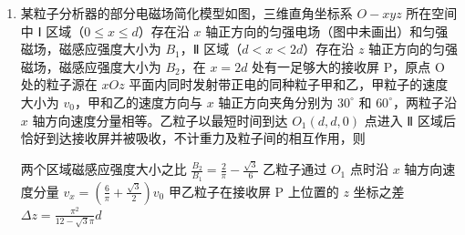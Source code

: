 \documentclass[\gkver]{gaokaozhenti}
\begin{document}
\begin{enumerate}
{	故选 BD。
}

\item
某粒子分析器的部分电磁场简化模型如图，三维直角坐标系 $O-xyz$ 所在空间中 Ⅰ 区域（$0 \leq x \leq d$）存在沿 $x$ 轴正方向的匀强电场（图中未画出）和匀强磁场，磁感应强度大小为 $B_{1}$，Ⅱ 区域（$d < x < 2d$）存在沿 $z$ 轴正方向的匀强磁场，磁感应强度大小为 $B_{2}$，在 $x = 2d$ 处有一足够大的接收屏 P，原点 O 处的粒子源在 $xOz$ 平面内同时发射带正电的同种粒子甲和乙，甲粒子的速度大小为 $v_{0}$，甲和乙的速度方向与 $x$ 轴正方向夹角分别为 $30^\circ$ 和 $60^\circ$，两粒子沿 $x$ 轴方向速度分量相等。乙粒子以最短时间到达 $O_{1}(d, d, 0)$ 点进入 Ⅱ 区域后恰好到达接收屏并被吸收，不计重力及粒子间的相互作用，则

\onepicture[w=7.16cm]{}

{两个区域磁感应强度大小之比 $\frac{B_{2}}{B_{1}} = \frac{2}{\pi} - \frac{\sqrt{3}}{6}$}
{乙粒子通过 $O_{1}$ 点时沿 $x$ 轴方向速度分量 $v_{x} = \left(\frac{6}{\pi} + \frac{\sqrt{3}}{2}\right)v_{0}$}
{甲乙粒子在接收屏 P 上位置的 $z$ 坐标之差 $\Delta z = \frac{\pi^{2}}{12 - \sqrt{3}\pi} d$}

\end{enumerate}
\end{document}
